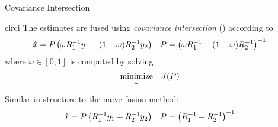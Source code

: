 \documentclass[aspectratio=1610]{beamer}
\begin{document}
\begin{frame}{Covariance Intersection}

\begin{rfshadedcolorbox}[title={Covariance Intersection}]{clrci}
The estimates are fused using \emph{covariance intersection} (\abbrCI) according to
\begin{align*}
    \hat{x} &= P\left( \omega R_1^{-1} y_1 + (1-\omega)R_2^{-1} y_2 \right) &
    P &= \left(\omega R_1^{-1} + (1-\omega)R_2^{-1} \right)^{-1}
\end{align*}
where $\omega\in[0,1]$ is computed by solving
\begin{equation*}
    \begin{aligned}
        & \underset{\omega}{\operatorname*{\rm minimize}} & & J(P)
    \end{aligned}
\end{equation*}
\end{rfshadedcolorbox}

\vspace{1em}

Similar in structure to the naive fusion method:
\begin{align*}
    \hat{x} &= P\left(R_1^{-1} y_1 + R_2^{-1} y_2  \right) &
    P &= \left(R_1^{-1} + R_2^{-1} \right)^{-1}
\end{align*}

\end{frame}
\end{document}
